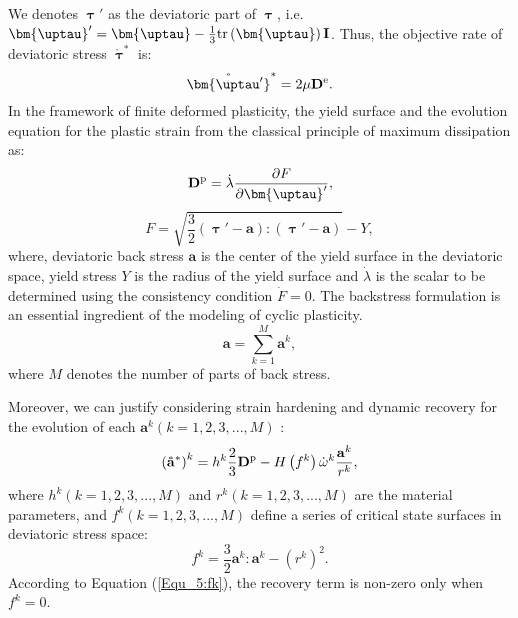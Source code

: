 We denotes $\bm{\uptau}'$ as the deviatoric part of $\bm{\uptau}$, i.e. ${\bm{\uptau}}' = {\bm{\uptau }} - \frac{1}{3}{\rm{tr}}\left( {\bm{\uptau }} \right){\mathbf{I}}$.
Thus, the objective rate of deviatoric stress ${\mathring {\bm{\uptau }}^{*}}$ is:
\begin{equation}
{\mathring {\bm{\uptau'}}^{*}} = 2\mu {{\mathbf{D}}^{\rm{e}}}.
\end{equation}
In the framework of finite deformed plasticity, the yield surface and the evolution equation for the plastic strain from the classical principle of maximum dissipation as:
\begin{equation}
{{{\mathbf{D}}^{\rm{p}}}} = \dot \lambda \frac{{\partial F}}{{\partial {\bm{\uptau }'}}},
\end{equation}
\begin{equation}
F = \sqrt {\frac{3}{2}\left( {{\bm{\uptau}}' - {\mathbf{a}}} \right):\left( {{\bm{\uptau}}' - {\mathbf{a}}} \right)}  - Y,
\end{equation}
where, deviatoric back stress ${\mathbf{a}}$ is the center of the yield surface in the deviatoric space, yield stress $Y$ is the radius of the yield surface and $\dot \lambda$ is the scalar to be determined using the consistency condition $\dot F = 0$.
The backstress formulation is an essential ingredient of the modeling of cyclic plasticity.
\begin{equation}
{\mathbf{a}} = \sum\limits_{k = 1}^M {{{\mathbf{a}}^k}},
\end{equation}
where $M$ denotes the number of parts of back stress.

Moreover, we can justify considering strain hardening and dynamic recovery for the evolution of each ${{\mathbf{a}}^k} ( k = 1,2,3,...,M )$ :
\begin{equation}
\label{Equ_5:dotak1}
\left({\mathbf{\mathring a}}^{*}\right)^k = {h^k}\frac{2}{3}{{{\mathbf{D}}^{\rm{p}}}} - H\left( {{f^k}} \right){\dot \omega ^k}\frac{{{{\mathbf{a}}^k}}}{{{r^k}}},
\end{equation}
where ${{{h}}^k} ( k = 1,2,3,...,M )$ and ${{{r}}^k} ( k = 1,2,3,...,M )$ are the material parameters, and ${{{f}}^k} ( k = 1,2,3,...,M )$ define a series of critical state surfaces in deviatoric stress space:
\begin{equation}
\label{Equ_5:fk}
{f^k} = \frac{3}{2}{{\mathbf{a}}^k}:{{\mathbf{a}}^k} - {\left( {{r^k}} \right)^2}.
\end{equation}
According to Equation (\ref{Equ_5:fk}), the recovery term is non-zero only when ${f^k} = 0$.

